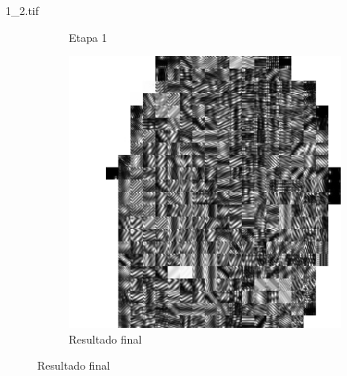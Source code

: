 \documentclass{beamer}
\begin{document}
\begin{frame}{1\_2.tif}
\begin{figure}
\begin{subfigure}[!ht]{0.32\textwidth}
                \caption{Etapa 1}
            \end{subfigure}
            \begin{subfigure}[!ht]{0.32\textwidth}
                \includegraphics[width=\columnwidth]{Fingerprints/1_2_final.jpg}
                \caption{Resultado final}
            \end{subfigure}
        \end{figure}
    \end{frame}
\end{document}
